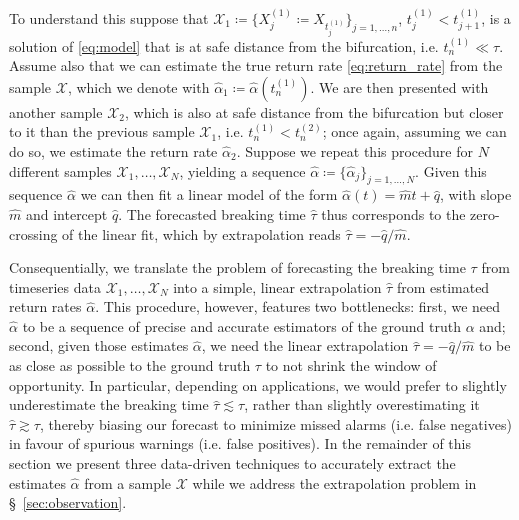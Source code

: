 \documentclass[openacc]{rsproca_new}
\begin{document}
To understand this suppose that $\mathcal{X}_1\coloneqq\{X^{(1)}_j\coloneqq X_{t^{(1)}_j}\}_{j=1,\dots,n}$, $t^{(1)}_j<t^{(1)}_{j+1}$, is a solution of \eqref{eq:model} that is at safe distance from the bifurcation, i.e. $t^{(1)}_n\ll\tau$.
Assume also that we can estimate the true return rate \eqref{eq:return_rate} from the sample $\mathcal{X}$, which we denote with $\hat\alpha_1\coloneqq\hat\alpha(t^{(1)}_n)$.
We are then presented with another sample $\mathcal{X}_2$, which is also at safe distance from the bifurcation but closer to it than the previous sample $\mathcal{X}_1$, i.e. $t^{(1)}_n<t^{(2)}_n$; once again, assuming we can do so, we estimate the return rate $\hat\alpha_2$.
Suppose we repeat this procedure for $N$ different samples $\mathcal{X}_1,\dots,\mathcal{X}_N$, yielding a sequence $\hat{\alpha}\coloneqq\{\hat\alpha_j\}_{j=1,\dots,N}$.
Given this sequence $\hat\alpha$ we can then fit a linear model of the form $\hat\alpha(t) = \hat m t + \hat q$, with slope $\hat m$ and intercept $\hat q$. 
The forecasted breaking time $\hat\tau$ thus corresponds to the zero-crossing of the linear fit, which by extrapolation reads $\hat\tau = -\hat q/\hat m$.

Consequentially, we translate the problem of forecasting the breaking time $\tau$ from timeseries data $\mathcal{X}_1,\dots,\mathcal{X}_N$ into a simple, linear extrapolation $\hat\tau$ from estimated return rates $\hat\alpha$.
This procedure, however, features two bottlenecks: first, we need $\hat\alpha$ to be a sequence of precise and accurate estimators of the ground truth $\alpha$ and; second, given those estimates $\hat\alpha$, we need the linear extrapolation $\hat\tau=-\hat q/\hat m$ to be as close as possible to the ground truth $\tau$ to not shrink the window of opportunity.
In particular, depending on applications, we would prefer to slightly underestimate the breaking time $\hat\tau\lesssim\tau$, rather than slightly overestimating it $\hat\tau\gtrsim\tau$, thereby biasing our forecast to minimize missed alarms (i.e. false negatives) in favour of spurious warnings (i.e. false positives).
In the remainder of this section we present three data-driven techniques to accurately extract the estimates $\hat\alpha$ from a sample $\mathcal{X}$ while we address the extrapolation problem in \S~\ref{sec:observation}.
\end{document}

